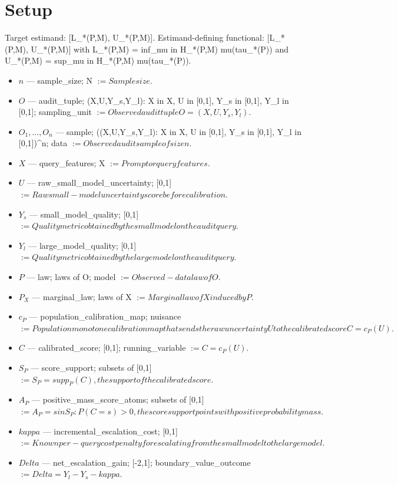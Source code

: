 \documentclass{article}
\begin{document}
\section{Setup}

Target estimand: [L_*(P,M), U_*(P,M)].
Estimand-defining functional: [L_*(P,M), U_*(P,M)] with L_*(P,M) = inf_{mu in H_*(P,M)} mu(tau_*(P)) and U_*(P,M) = sup_{mu in H_*(P,M)} mu(tau_*(P)).
\begin{itemize}
  \item $n$ --- sample_size; N $:= Sample size.$
  \item $O$ --- audit_tuple; {(X,U,Y_s,Y_l): X in X, U in [0,1], Y_s in [0,1], Y_l in [0,1]}; sampling_unit $:= Observed audit tuple O = (X, U, Y_s, Y_l).$
  \item $O_1, ..., O_n$ --- sample; ({(X,U,Y_s,Y_l): X in X, U in [0,1], Y_s in [0,1], Y_l in [0,1]})^n; data $:= Observed audit sample of size n.$
  \item $X$ --- query_features; X $:= Prompt or query features.$
  \item $U$ --- raw_small_model_uncertainty; [0,1] $:= Raw small-model uncertainty score before calibration.$
  \item $Y_s$ --- small_model_quality; [0,1] $:= Quality metric obtained by the small model on the audit query.$
  \item $Y_l$ --- large_model_quality; [0,1] $:= Quality metric obtained by the large model on the audit query.$
  \item $P$ --- law; laws of O; model $:= Observed-data law of O.$
  \item $P_X$ --- marginal_law; laws of X $:= Marginal law of X induced by P.$
  \item $c_P$ --- population_calibration_map; nuisance $:= Population monotone calibration map that sends the raw uncertainty U to the calibrated score C = c_P(U).$
  \item $C$ --- calibrated_score; [0,1]; running_variable $:= C = c_P(U).$
  \item $S_P$ --- score_support; subsets of [0,1] $:= S_P = supp_P(C), the support of the calibrated score.$
  \item $A_P$ --- positive_mass_score_atoms; subsets of [0,1] $:= A_P = {s in S_P : P(C = s) > 0}, the score support points with positive probability mass.$
  \item $kappa$ --- incremental_escalation_cost; [0,1] $:= Known per-query cost penalty for escalating from the small model to the large model.$
  \item $Delta$ --- net_escalation_gain; [-2,1]; boundary_value_outcome $:= Delta = Y_l - Y_s - kappa.$

\end{itemize}
\end{document}
